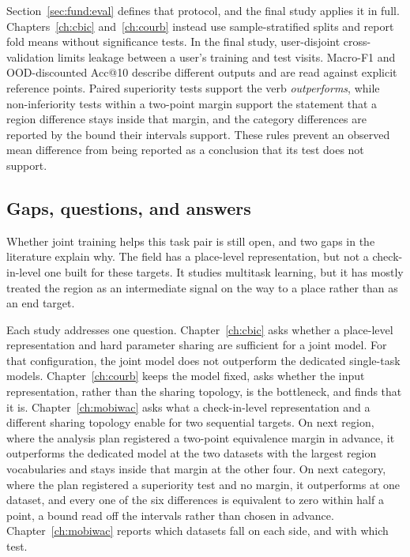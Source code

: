 Section~\ref{sec:fund:eval} defines that protocol, and the final study applies it in
full. Chapters~\ref{ch:cbic} and~\ref{ch:courb} instead use sample-stratified splits
and report fold means without significance tests. In the final study, user-disjoint
cross-validation limits leakage between a user's training and test visits. Macro-F1 and OOD-discounted
Acc@10 describe different outputs and are read against explicit reference points.
Paired superiority tests support the verb \emph{outperforms}, while non-inferiority
tests within a two-point margin support the statement that a region difference stays inside that
margin, and the category differences are reported by the bound their intervals support. These rules prevent an
observed mean difference from being reported as a conclusion that its test does not
support.

\subsection{Gaps, questions, and answers}

Whether joint training helps this task pair is still open, and two gaps in the
literature explain why. The field has a place-level representation, but not a
check-in-level one built for these targets. It studies multitask learning, but it has
mostly treated the region as an intermediate signal on the way to a place rather than
as an end target.

Each study addresses one question. Chapter~\ref{ch:cbic} asks whether a
place-level representation and hard parameter sharing are sufficient for a joint
model. For that configuration, the joint model does not outperform the dedicated
single-task models. Chapter~\ref{ch:courb} keeps the model fixed, asks whether the
input representation, rather than the sharing topology, is the bottleneck, and finds
that it is. Chapter~\ref{ch:mobiwac} asks what a check-in-level representation and a
different sharing topology enable for two sequential targets.
On next region, where the analysis plan registered a
two-point equivalence margin in advance, it outperforms the dedicated model at the two datasets
with the largest region vocabularies and stays inside that margin at the other four. On next
category, where the plan registered a superiority test and no margin, it outperforms at one
dataset, and every one of the six differences is equivalent to zero within half a point, a bound
read off the intervals rather than chosen in advance. Chapter~\ref{ch:mobiwac} reports which datasets fall on each
side, and with which test.

